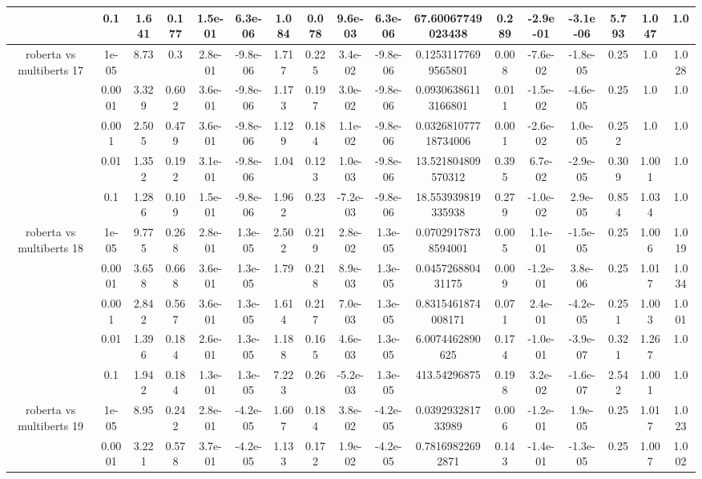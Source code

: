 \begin{tabular}{|c|c|c|c|c|c|c|c|c|c|c|c|c|c|c|c|c|}
 & 0.1 & 1.641 & 0.177 & 1.5e-01 & 6.3e-06 & 1.084 & 0.078 & 9.6e-03 & 6.3e-06 & 67.60067749023438 & 0.289 & -2.9e-01 & -3.1e-06 & 5.793 & 1.047 & 1.0 \\
\hline
\multirow{5}{*}{roberta  vs multiberts 17} & 1e-05 & 8.73 & 0.3 & 2.8e-01 & -9.8e-06 & 1.717 & 0.225 & 3.4e-02 & -9.8e-06 & 0.12531177699565801 & 0.008 & -7.6e-02 & -1.8e-05 & 0.25 & 1.0 & 1.028 \\
 & 0.0001 & 3.329 & 0.602 & 3.6e-01 & -9.8e-06 & 1.173 & 0.197 & 3.0e-02 & -9.8e-06 & 0.09306386113166801 & 0.011 & -1.5e-02 & -4.6e-05 & 0.25 & 1.0 & 1.0 \\
 & 0.001 & 2.505 & 0.479 & 3.6e-01 & -9.8e-06 & 1.129 & 0.184 & 1.1e-02 & -9.8e-06 & 0.032681077718734006 & 0.001 & -2.6e-02 & 1.0e-05 & 0.252 & 1.0 & 1.0 \\
 & 0.01 & 1.352 & 0.192 & 3.1e-01 & -9.8e-06 & 1.04 & 0.123 & 1.0e-03 & -9.8e-06 & 13.521804809570312 & 0.395 & 6.7e-02 & -2.9e-05 & 0.309 & 1.001 & 1.0 \\
 & 0.1 & 1.286 & 0.109 & 1.5e-01 & -9.8e-06 & 1.962 & 0.23 & -7.2e-03 & -9.8e-06 & 18.553939819335938 & 0.279 & -1.0e-02 & 2.9e-05 & 0.854 & 1.034 & 1.0 \\
\hline
\multirow{5}{*}{roberta  vs multiberts 18} & 1e-05 & 9.775 & 0.268 & 2.8e-01 & 1.3e-05 & 2.502 & 0.219 & 2.8e-02 & 1.3e-05 & 0.07029178738594001 & 0.005 & 1.1e-01 & -1.5e-05 & 0.25 & 1.006 & 1.019 \\
 & 0.0001 & 3.658 & 0.668 & 3.6e-01 & 1.3e-05 & 1.79 & 0.218 & 8.9e-03 & 1.3e-05 & 0.045726880431175 & 0.009 & -1.2e-01 & 3.8e-06 & 0.25 & 1.017 & 1.034 \\
 & 0.001 & 2.842 & 0.567 & 3.6e-01 & 1.3e-05 & 1.614 & 0.217 & 7.0e-03 & 1.3e-05 & 0.8315461874008171 & 0.071 & 2.4e-01 & -4.2e-05 & 0.251 & 1.003 & 1.001 \\
 & 0.01 & 1.396 & 0.184 & 2.6e-01 & 1.3e-05 & 1.188 & 0.165 & 4.6e-03 & 1.3e-05 & 6.0074462890625 & 0.174 & -1.0e-01 & -3.9e-07 & 0.321 & 1.267 & 1.0 \\
 & 0.1 & 1.942 & 0.184 & 1.3e-01 & 1.3e-05 & 7.223 & 0.26 & -5.2e-03 & 1.3e-05 & 413.54296875 & 0.198 & 3.2e-02 & -1.6e-07 & 2.542 & 1.001 & 1.0 \\
\hline
\multirow{5}{*}{roberta  vs multiberts 19} & 1e-05 & 8.95 & 0.242 & 2.8e-01 & -4.2e-05 & 1.607 & 0.184 & 3.8e-02 & -4.2e-05 & 0.039293281733989 & 0.006 & -1.2e-01 & 1.9e-05 & 0.25 & 1.017 & 1.023 \\
 & 0.0001 & 3.221 & 0.578 & 3.7e-01 & -4.2e-05 & 1.133 & 0.172 & 1.9e-02 & -4.2e-05 & 0.78169822692871 & 0.143 & -1.4e-01 & -1.3e-05 & 0.25 & 1.007 & 1.002 \\

\end{tabular}
